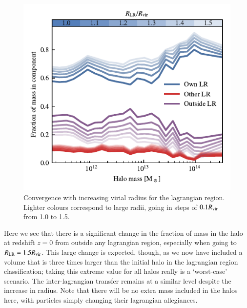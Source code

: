 \begin{figure}
    \centering
    \includegraphics{figures/radius_convergence.pdf}
    \vspace{-0.7cm}
    \caption{Convergence with increasing virial radius for the lagrangian region.
    Lighter colours correspond
    to large radii, going in steps of $0.1R_{\rm vir}$ from 1.0 to 1.5.}
    \label{fig:radius_dependence}
\end{figure}

Here we see that there is a significant change in the fraction of mass in the
halo at redshift $z=0$ from outside any lagrangian region, especially when going to
$R_{\rm LR} = 1.5 R_{\rm vir}$. This large change is expected, though, as we now
have included a volume that is three times larger than the initial halo in the
lagrangian region classification; taking this extreme value for all halos
really is a `worst-case' scenario. The inter-lagrangian transfer remains at a similar level
despite the increase in radius. Note that there will be no extra mass included in the
halos here, with particles simply changing their lagrangian allegiances.